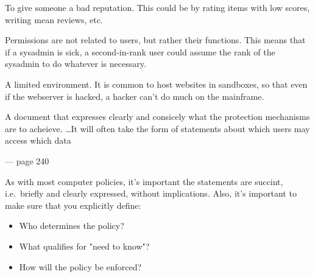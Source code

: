 \begin{definition}
    To give someone a bad reputation. This could be by rating items
    with low scores, writing mean reviews, etc.
\end{definition}

\begin{definition}
    Permissions are not related to users, but rather their functions. 
    This means that if a sysadmin is sick, a second-in-rank user could
    assume the rank of the sysadmin to do whatever is necessary.
\end{definition}

\begin{definition}[Sandbox]
    A limited environment. It is common to host websites in sandboxes,
    so that even if the webserver is hacked, a hacker can't do much on the
    mainframe.
\end{definition}


\begin{definition}\label{secpol}
\end{definition}



\begin{definition}[Secrecy]
\end{definition}

\begin{definition}

\end{definition}

\begin{definition}\label{secfunreq}
    
\end{definition}

    \epigraph{A document that expresses clearly and consicely what the 
    protection mechanisms are to acheieve. \dots It will often take the form of 
    statements about which users may access which data}{--- page 240}

    As with most computer policies, it's important the statements
    are succint, i.e.\ briefly and clearly expressed, without implications. 
    Also, it's important to make sure that you explicitly define:
    \begin{itemize}
        \item Who determines the policy?
        \item What qualifies for "need to know"?
        \item How will the policy be enforced?
    \end{itemize}

